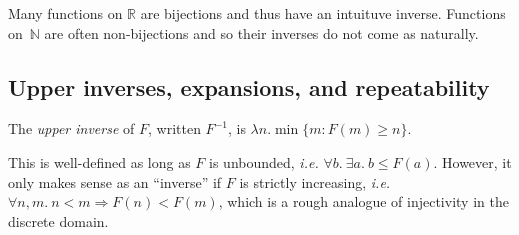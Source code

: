 Many functions on $\mathbb{R}$ are bijections and thus have an intuituve inverse.  
Functions on~$\mathbb{N}$ are often non-bijections and so their inverses
do not come as naturally.

\subsection{Upper inverses, expansions, and repeatability}
\begin{defn} \label{defn: inverse}
The \emph{upper inverse} of $F$, written $F^{-1}$, 
is $\lambda n. \min\{m : F(m)\ge n\}$.\end{defn}
This is well-defined as long as $F$ is unbounded, 
\emph{i.e.} $\forall b.~\exists a.~ b \leq F(a)$.  
However, it only makes sense as an ``inverse'' if $F$ is strictly
increasing, \emph{i.e.} $\forall n,m.~n < m \Rightarrow F(n) < F(m)$, which is
a rough analogue of injectivity in the discrete domain.


